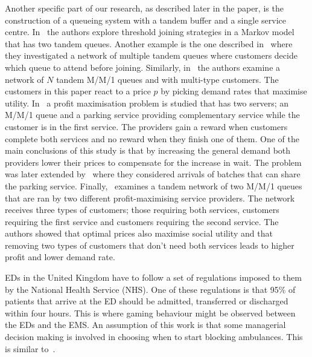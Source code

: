 Another specific part of our research, as described later in the paper, is the 
construction of a queueing system with a tandem buffer and a single service
centre.
In~\cite{d2015pure} the authors explore threshold joining strategies in a 
Markov model that has two tandem queues.
Another example is the one described in~\cite{burnetas2013customer}
where they investigated a network of multiple tandem queues where customers 
decide which queue to attend before joining.
Similarly, in~\cite{bacsar2002stackelberg} the authors examine a network of 
\(N\) tandem M/M/1 queues and with multi-type customers. 
The customers in this paper react to a price \(p\) by picking demand rates that 
maximise utility.
In~\cite{veltman2005equilibrium} a profit maximisation problem is studied that
has two servers; an M/M/1 queue and a parking service providing complementary 
service while the customer is in the first service. 
The providers gain a reward when customers complete both services and no reward 
when they finish one of them.
One of the main conclusions of this study is that by increasing the general 
demand both providers lower their prices to compensate for the increase in wait.
The problem was later extended by~\cite{sun2009equilibrium} where they 
considered arrivals of batches that can share the parking service.
Finally,~\cite{afeche2007decentralized} examines a tandem network of two M/M/1 
queues that are ran by two different profit-maximising service providers.
The network receives three types of customers; those requiring both services, 
customers requiring the first service and customers requiring the second service.
The authors showed that optimal prices also maximise social utility and that
removing two types of customers that don't need both services leads to higher 
profit and lower demand rate.

EDs in the United Kingdom have to follow a set of regulations imposed to 
them by the National Health Service (NHS).
One of these regulations is that 95\% of patients that arrive at the ED should 
be admitted, transferred or discharged within four hours.
This is where gaming behaviour might be observed between the EDs and the EMS.
An assumption of this work is that some managerial decision making is involved
in choosing when to start blocking ambulances.
This is similar to~\cite{deo2011centralized}.

